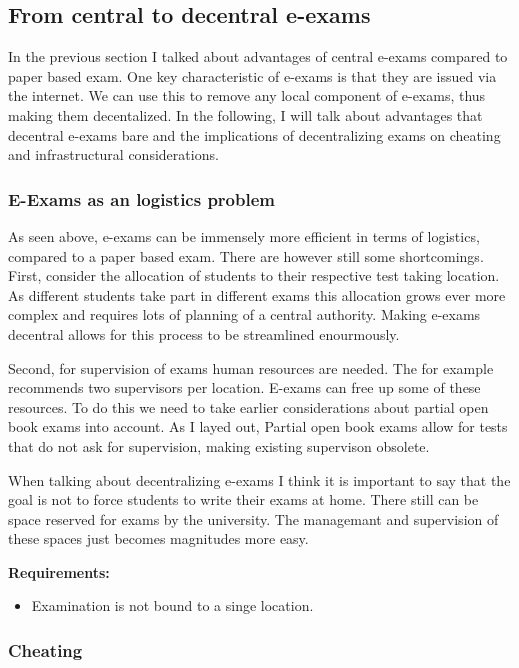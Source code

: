 \hypertarget{from-central-to-decentral-e-exams}{%
\subsection{From central to decentral
e-exams}\label{from-central-to-decentral-e-exams}}

In the previous section I talked about advantages of central e-exams
compared to paper based exam. One key characteristic of e-exams is that
they are issued via the internet. We can use this to remove any local
component of e-exams, thus making them decentalized. In the following, I
will talk about advantages that decentral e-exams bare and the
implications of decentralizing exams on cheating and infrastructural
considerations.

\hypertarget{e-exams-as-an-logistics-problem}{%
\subsubsection{E-Exams as an logistics
problem}\label{e-exams-as-an-logistics-problem}}

As seen above, e-exams can be immensely more efficient in terms of
logistics, compared to a paper based exam. There are however still some
shortcomings. First, consider the allocation of students to their
respective test taking location. As different students take part in
different exams this allocation grows ever more complex and requires
lots of planning of a central authority. Making e-exams decentral allows
for this process to be streamlined enourmously.

Second, for supervision of exams human resources are needed. The for
example recommends two supervisors per location. E-exams can free up
some of these resources. To do this we need to take earlier
considerations about partial open book exams into account. As I layed
out, Partial open book exams allow for tests that do not ask for
supervision, making existing supervison obsolete.

When talking about decentralizing e-exams I think it is important to say
that the goal is not to force students to write their exams at home.
There still can be space reserved for exams by the university. The
managemant and supervision of these spaces just becomes magnitudes more
easy.

\textbf{Requirements:}

\begin{itemize}
\tightlist
\item
  Examination is not bound to a singe location.
\end{itemize}

\hypertarget{cheating}{%
\subsubsection{Cheating}\label{cheating}}
